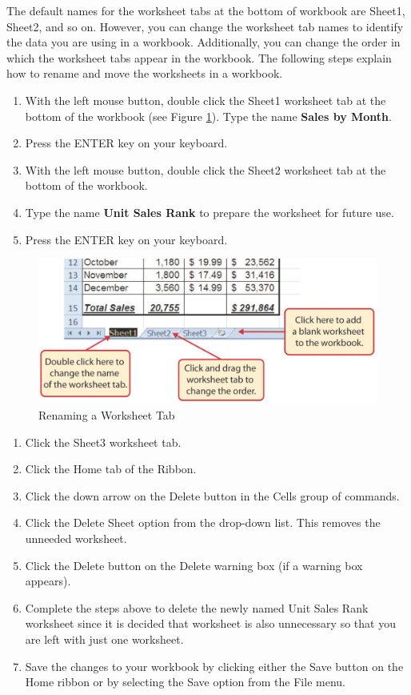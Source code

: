 The default names for the worksheet tabs at the bottom of workbook are Sheet1, Sheet2, and so on. However, you can change the worksheet tab names to identify the data you are using in a workbook. Additionally, you can change the order in which the worksheet tabs appear in the workbook. The following steps explain how to rename and move the worksheets in a workbook.

\begin{enumerate}
	\item With the left mouse button, double click the Sheet1 worksheet tab at the bottom of the workbook (see Figure \ref{01:fig47}). Type the name \textbf{Sales by Month}.
	\item Press the ENTER key on your keyboard.
	\item With the left mouse button, double click the Sheet2 worksheet tab at the bottom of the workbook.
	\item Type the name \textbf{Unit Sales Rank} to prepare the worksheet for future use.
	\item Press the ENTER key on your keyboard.
\end{enumerate}

\begin{figure}[H]
	\centering
	\includegraphics[width=\maxwidth{.95\linewidth}]{gfx/ch01_fig47}
	\caption{Renaming a Worksheet Tab}
	\label{01:fig47}
\end{figure}

\begin{enumerate}
	\item Click the Sheet3 worksheet tab.
	\item Click the Home tab of the Ribbon.
	\item Click the down arrow on the Delete button in the Cells group of commands.
	\item Click the Delete Sheet option from the drop-down list. This removes the unneeded worksheet.
	\item Click the Delete button on the Delete warning box (if a warning box appears).
	\item Complete the steps above to delete the newly named Unit Sales Rank worksheet since it is decided that worksheet is also unnecessary so that you are left with just one worksheet.
	\item Save the changes to your workbook by clicking either the Save button on the Home ribbon or by selecting the Save option from the File menu.
\end{enumerate}

